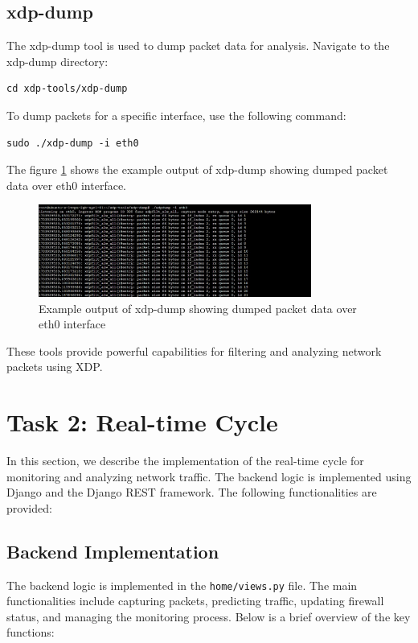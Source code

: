 \subsection{xdp-dump}
The xdp-dump tool is used to dump packet data for analysis. Navigate to the xdp-dump directory:
\begin{verbatim}
cd xdp-tools/xdp-dump
\end{verbatim}

To dump packets for a specific interface, use the following command:
\begin{verbatim}
sudo ./xdp-dump -i eth0
\end{verbatim}
The figure \ref{fig:xdp-dump-example} shows the example output of xdp-dump showing dumped packet data over eth0 interface.
\begin{figure}[H]
    \centering
    \includegraphics[width=0.8\textwidth]{../images/xdpdump-eth0.jpeg}
    \caption{Example output of xdp-dump showing dumped packet data over eth0 interface}
    \label{fig:xdp-dump-example}
\end{figure}

These tools provide powerful capabilities for filtering and analyzing network packets using XDP.

\section{Task 2: Real-time Cycle}
In this section, we describe the implementation of the real-time cycle for monitoring and analyzing network traffic. The backend logic is implemented using Django and the Django REST framework. The following functionalities are provided:

\subsection{Backend Implementation}
The backend logic is implemented in the \texttt{home/views.py} file. The main functionalities include capturing packets, predicting traffic, updating firewall status, and managing the monitoring process. Below is a brief overview of the key functions:

